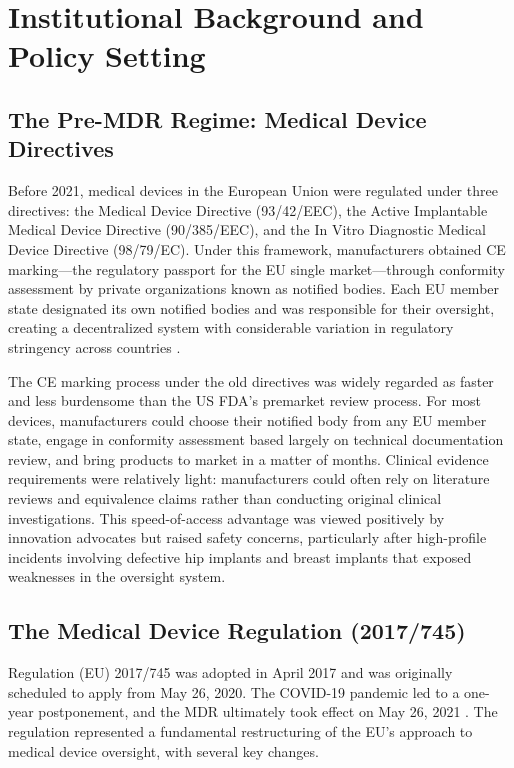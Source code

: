 \documentclass[12pt]{article}
\begin{document}

\section{Institutional Background and Policy Setting}
\label{sec:background}

\subsection{The Pre-MDR Regime: Medical Device Directives}

Before 2021, medical devices in the European Union were regulated under three directives: the Medical Device Directive (93/42/EEC), the Active Implantable Medical Device Directive (90/385/EEC), and the In Vitro Diagnostic Medical Device Directive (98/79/EC). Under this framework, manufacturers obtained CE marking---the regulatory passport for the EU single market---through conformity assessment by private organizations known as notified bodies. Each EU member state designated its own notified bodies and was responsible for their oversight, creating a decentralized system with considerable variation in regulatory stringency across countries \citep{grennan2020regulating}.

The CE marking process under the old directives was widely regarded as faster and less burdensome than the US FDA's premarket review process. For most devices, manufacturers could choose their notified body from any EU member state, engage in conformity assessment based largely on technical documentation review, and bring products to market in a matter of months. Clinical evidence requirements were relatively light: manufacturers could often rely on literature reviews and equivalence claims rather than conducting original clinical investigations. This speed-of-access advantage was viewed positively by innovation advocates but raised safety concerns, particularly after high-profile incidents involving defective hip implants and breast implants that exposed weaknesses in the oversight system.

\subsection{The Medical Device Regulation (2017/745)}

Regulation (EU) 2017/745 was adopted in April 2017 and was originally scheduled to apply from May 26, 2020. The COVID-19 pandemic led to a one-year postponement, and the MDR ultimately took effect on May 26, 2021 \citep{eucourt2017regulation}. The regulation represented a fundamental restructuring of the EU's approach to medical device oversight, with several key changes.
\end{document}
